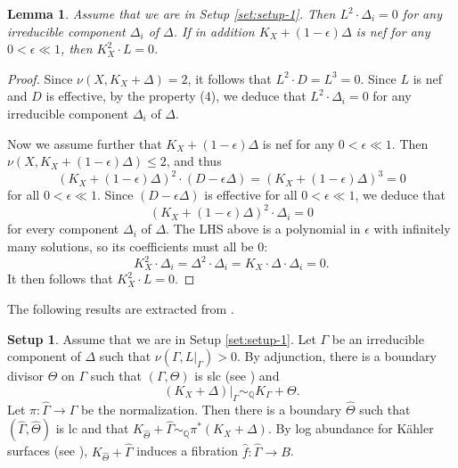 \documentclass[12pt]{amsart}
\newcommand{\<}{\leq}
\def\eps{\epsilon}
\newcommand{\D}{\Delta}
\newtheorem{lemma}[theorem]{Lemma}
\theoremstyle{remark}
\theoremstyle{definition}
\theoremstyle{definition}
\numberwithin{equation}{section}
\theoremstyle{definition}
\theoremstyle{definition}
\newtheorem{setup}[theorem]{Setup}
\begin{document}
 



\begin{lemma}\label{lem:nu-2-computation-1}
  Assume that we are in  Setup \ref{set:setup-1}.  
  Then $L^2 \cdot \Delta_i = 0$ for any irreducible component $\Delta_i$ of $\D$. 
  If in addition  $K_X+(1-\epsilon)\D$ is nef for any $0<\epsilon\ll 1$,
  then $K_X^2\cdot L = 0$. 
\end{lemma}

\begin{proof}
 Since $\nu(X, K_X+\Delta)=2$, it follows that 
   $L^2\cdot D = L^3 = 0.$ 
  Since $L$ is nef and   $D$ is effective, by the property (4),  
  we deduce that $L^2\cdot \Delta_i = 0$ for any irreducible component $\Delta_i$ of $\D$.  

  Now we assume further that $K_X+(1-\epsilon)\D$ is nef for any $0< \epsilon \ll 1$. 
  Then $\nu(X, K_X+(1-\eps)\Delta)\<2$, and thus 
  \[(K_X+(1-\eps)\Delta)^2\cdot(D-\epsilon\Delta) = (K_X+(1-\eps)\Delta)^3=0\] for all $0<\eps\ll 1$.
  Since $(D-\epsilon\Delta)$ is effective for all $0<\eps\ll 1$,   we deduce that  
  \[(K_X+(1-\eps)\Delta)^2\cdot\Delta_i=0\] for every component $\Delta_i$ of $\Delta$. 
  The LHS above is a  polynomial in $\eps$ with infinitely many solutions,  so its coefficients must all be $0$: 
\[K_X^2\cdot \Delta_i = \Delta^2 \cdot \Delta_i= K_X\cdot \Delta \cdot \Delta_i = 0. %
\]  
It  then follows that $K_X^2\cdot L =0$.  
\end{proof}



The following  results   are extracted from  \cite[Lemma 14.2]{Kol92}. 

\begin{setup}\label{set:setup-2}
    Assume that we are in  Setup \ref{set:setup-1}. 
Let $\Gamma$ be an irreducible component of $\D$ such that $\nu(\Gamma, L|_\Gamma) >0$. 
By adjunction, there is a boundary divisor $\Theta$ on $\Gamma$ such that $(\Gamma, \Theta)$ is slc (see \cite[Remark 1.2(5)]{Fuj00}) and  
\[  
(K_X+\D)|_\Gamma \sim_{\mathbb{Q}} K_{\Gamma} + \Theta. 
\] 
Let $\pi\colon \widehat{\Gamma} \to \Gamma$ be the normalization. 
Then there is a boundary $\widehat{\Theta}$ such that  $(\widehat{\Gamma}, \widehat{\Theta})$ is lc and that $K_{\widehat{\Theta}} + \widehat{\Gamma} \sim_{\mathbb{Q}} \pi^*(K_X+\D)$.  
By log abundance for K\"ahler surfaces (see \cite[Theorem 6.3]{DasOu2022}), 
$K_{\widehat{\Theta}} + \widehat{\Gamma}$ induces a fibration $\hat{f}\colon \widehat{\Gamma} \to B$.
\end{setup}
 
\end{document}
